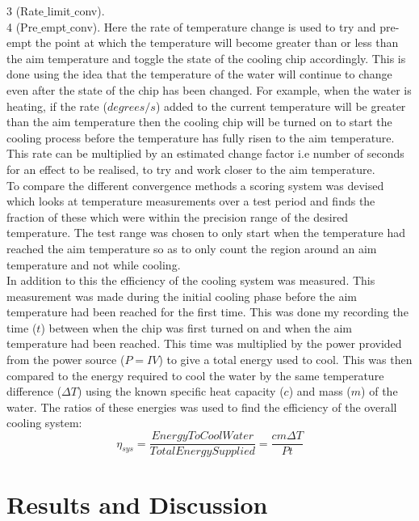 \documentclass[10pt]{article}
\begin{document}
3 (Rate$\_$limit$\_$conv). \\

4 (Pre$\_$empt$\_$conv). Here the rate of temperature change is used to try and pre-empt the point at which the temperature will become greater than or less than the aim temperature and toggle the state of the cooling chip accordingly. This is done using the idea that the temperature of the water will continue to change even after the state of the chip has been changed. For example, when the water is heating, if the rate ($degrees/s$) added to the current temperature will be greater than the aim temperature then the cooling chip will be turned on to start the cooling process before the temperature has fully risen to the aim temperature. This rate can be multiplied by an estimated change factor i.e number of seconds for an effect to be realised, to try and work closer to the aim temperature.\\

To compare the different convergence methods a scoring system was devised which looks at temperature measurements over a test period and finds the fraction of these which were within the precision range of the desired temperature. The test range was chosen to only start when the temperature had reached the aim temperature so as to only count the region around an aim temperature and not while cooling. \\

In addition to this the efficiency of the cooling system was measured. This measurement was made during the initial cooling phase before the aim temperature had been reached for the first time. This was done my recording the time ($t$) between when the chip was first turned on and when the aim temperature had been reached. This time was multiplied by the power provided from the power source ($P=IV$) to give a total energy used to cool. This was then compared to the energy required to cool the water by the same temperature difference ($\Delta T$) using the known specific heat capacity ($c$) and mass ($m$) of the water. The ratios of these energies was used to find the efficiency of the overall cooling system:
\begin{equation}
    \eta_{sys} = \frac{EnergyToCoolWater}{TotalEnergySupplied} = \frac{cm\Delta T}{Pt}
\end{equation}


\section*{Results and Discussion}
\end{document}

